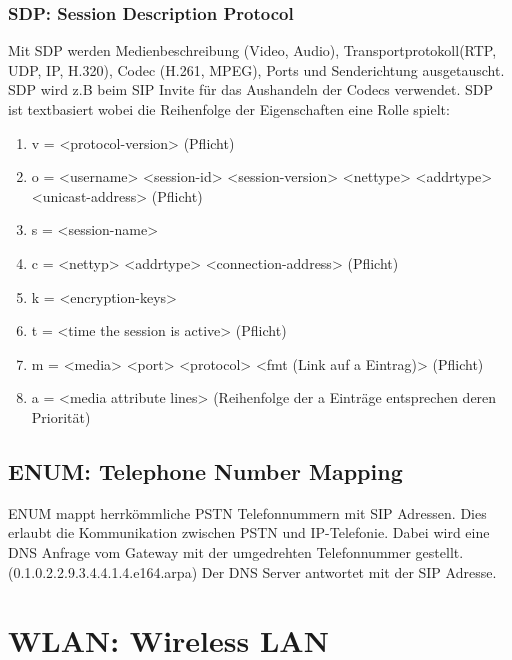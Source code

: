 \subsubsection{SDP: Session Description Protocol}
Mit SDP werden Medienbeschreibung (Video, Audio), Transportprotokoll(RTP, UDP, IP, H.320),  Codec (H.261, MPEG), Ports und Senderichtung ausgetauscht. SDP wird z.B beim SIP Invite für das Aushandeln der Codecs verwendet. SDP ist textbasiert wobei die Reihenfolge der Eigenschaften eine Rolle spielt:
\begin{enumerate}
	\item v = <protocol-version> (Pflicht)
	\item o = <username> <session-id> <session-version> <nettype> <addrtype> <unicast-address> (Pflicht)
	\item s = <session-name>
	\item c = <nettyp> <addrtype> <connection-address> (Pflicht)
	\item k = <encryption-keys>
	\item t = <time the session is active> (Pflicht)
	\item m = <media> <port> <protocol> <fmt (Link auf a Eintrag)>  (Pflicht)
	\item a = <media attribute lines> (Reihenfolge der a Einträge entsprechen deren Priorität)
\end{enumerate}

\subsection{ENUM: Telephone Number Mapping}
ENUM mappt herrkömmliche PSTN Telefonnummern mit SIP Adressen. Dies erlaubt die Kommunikation zwischen PSTN und IP-Telefonie. Dabei wird eine DNS Anfrage vom Gateway mit der umgedrehten Telefonnummer gestellt. (0.1.0.2.2.9.3.4.4.1.4.e164.arpa) Der DNS Server antwortet mit der SIP Adresse.


\section{WLAN: Wireless LAN}

